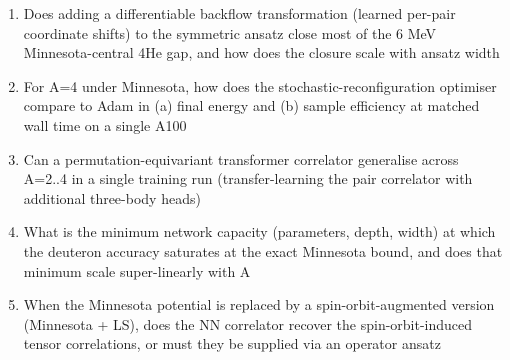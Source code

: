 \begin{enumerate}[leftmargin=1.6em,itemsep=0.2em,topsep=0.2em,label=Q\arabic*.]
\item Does adding a differentiable backflow transformation (learned per-pair coordinate shifts) to the symmetric ansatz close most of the 6 MeV Minnesota-central 4He gap, and how does the closure scale with ansatz width
\item For A=4 under Minnesota, how does the stochastic-reconfiguration optimiser compare to Adam in (a) final energy and (b) sample efficiency at matched wall time on a single A100
\item Can a permutation-equivariant transformer correlator generalise across A=2..4 in a single training run (transfer-learning the pair correlator with additional three-body heads)
\item What is the minimum network capacity (parameters, depth, width) at which the deuteron accuracy saturates at the exact Minnesota bound, and does that minimum scale super-linearly with A
\item When the Minnesota potential is replaced by a spin-orbit-augmented version (Minnesota + LS), does the NN correlator recover the spin-orbit-induced tensor correlations, or must they be supplied via an operator ansatz
\end{enumerate}

